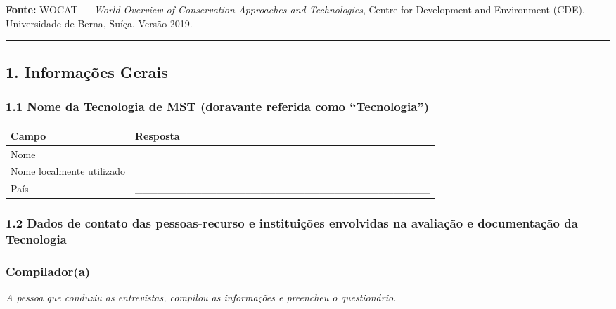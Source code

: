 \textbf{Fonte:} WOCAT --- \emph{World Overview of Conservation Approaches and Technologies}, Centre for Development and Environment (CDE), Universidade de Berna, Suíça. Versão 2019.

\newpage

\begin{center}\rule{0.5\linewidth}{0.5pt}\end{center}

\subsection{1. Informações Gerais}\label{informauxe7uxf5es-gerais}

\subsubsection{1.1 Nome da Tecnologia de MST (doravante referida como ``Tecnologia'')}\label{nome-da-tecnologia-de-mst-doravante-referida-como-tecnologia}

{
\begin{longtable}[]{@{}ll@{}}
\toprule\noalign{}
Campo & Resposta \\
\midrule\noalign{}
\endhead
\bottomrule\noalign{}
\endlastfoot
Nome & \_\_\_\_\_\_\_\_\_\_\_\_\_\_\_\_\_\_\_\_\_\_\_\_\_\_\_\_\_\_\_\_\_\_\_\_\_\_\_\_ \\
Nome localmente utilizado & \_\_\_\_\_\_\_\_\_\_\_\_\_\_\_\_\_\_\_\_\_\_\_\_\_\_\_\_\_\_\_\_\_\_\_\_\_\_\_\_ \\
País & \_\_\_\_\_\_\_\_\_\_\_\_\_\_\_\_\_\_\_\_\_\_\_\_\_\_\_\_\_\_\_\_\_\_\_\_\_\_\_\_ \\
\end{longtable}
}

\subsubsection{1.2 Dados de contato das pessoas-recurso e instituições envolvidas na avaliação e documentação da Tecnologia}\label{dados-de-contato-das-pessoas-recurso-e-instituiuxe7uxf5es-envolvidas-na-avaliauxe7uxe3o-e-documentauxe7uxe3o-da-tecnologia}

\subsubsection{Compilador(a)}\label{compiladora}

\emph{A pessoa que conduziu as entrevistas, compilou as informações e preencheu o questionário.}

